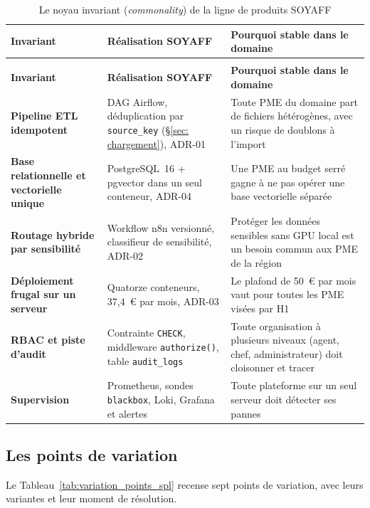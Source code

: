 \begin{longtable}{|>{\raggedright\arraybackslash}p{3.0cm}|>{\raggedright\arraybackslash}p{5.5cm}|>{\raggedright\arraybackslash}p{5.5cm}|}
\caption{Le noyau invariant (\textit{commonality}) de la ligne de produits SOYAFF}
\label{tab:invariants_spl} \\
\hline
\rowcolor[HTML]{EFEFEF}
\textbf{Invariant} & \textbf{Réalisation SOYAFF} & \textbf{Pourquoi stable dans le domaine} \\ \hline
\endfirsthead
\multicolumn{3}{c}{\tablename\ \thetable\ (suite)} \\
\hline
\rowcolor[HTML]{EFEFEF}
\textbf{Invariant} & \textbf{Réalisation SOYAFF} & \textbf{Pourquoi stable dans le domaine} \\ \hline
\endhead
\hline
\endlastfoot
\textbf{Pipeline ETL idempotent} & DAG Airflow, déduplication par \texttt{source\_key} (\S\ref{sec: chargement}), ADR-01 & Toute PME du domaine part de fichiers hétérogènes, avec un risque de doublons à l'import \\ \hline
\textbf{Base relationnelle et vectorielle unique} & PostgreSQL~16 + pgvector dans un seul conteneur, ADR-04 & Une PME au budget serré gagne à ne pas opérer une base vectorielle séparée \\ \hline
\textbf{Routage hybride par sensibilité} & Workflow n8n versionné, classifieur de sensibilité, ADR-02 & Protéger les données sensibles sans GPU local est un besoin commun aux PME de la région \\ \hline
\textbf{Déploiement frugal sur un serveur} & Quatorze conteneurs, 37,4~€ par mois, ADR-03 & Le plafond de 50~€ par mois vaut pour toutes les PME visées par H1 \\ \hline
\textbf{RBAC et piste d'audit} & Contrainte \texttt{CHECK}, middleware \texttt{authorize()}, table \texttt{audit\_logs} & Toute organisation à plusieurs niveaux (agent, chef, administrateur) doit cloisonner et tracer \\ \hline
\textbf{Supervision} & Prometheus, sondes \texttt{blackbox}, Loki, Grafana et alertes & Toute plateforme sur un seul serveur doit détecter ses pannes \\ \hline
\end{longtable}

\subsection{Les points de variation}
\label{sec:spl_variation}

Le Tableau~\ref{tab:variation_points_spl} recense sept points de variation, avec leurs variantes et leur moment de résolution.

